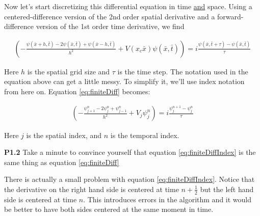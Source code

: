 
\vspace{0.25in}
Now let's start discretizing this differential equation in time
\underline{and} space.  Using a centered-difference version of the 2nd
order spatial derivative and a forward-difference version of the 1st
order time derivative, we find

\begin{align}
 \left( - \frac{\psi(\bar{x}+h,\bar{t}) - 2 \psi(\bar{x},\bar{t}) + \psi(\bar{x} - h,\bar{t})}{h^2} +
   V(x_c \bar{x}) \psi(\bar{x},\bar{t}) \right) = i \frac{\psi(\bar{x},\bar{t}+\tau) -
   \psi(\bar{x},\bar{t})}{\tau}\label{eq:finiteDiff}
\end{align}

Here $h$ is the spatial grid size and $\tau$ is the time step.  The
notation used in the equation above can get a little messy.  To
simplify it, we'll use index notation from here on.  Equation \eqref{eq:finiteDiff}
becomes:

\begin{align}
 \left( - \frac{\psi_{j+1}^n - 2 \psi_j^n + \psi_{j-1}^n}{h^2} +
   V_j \psi_j^n \right) = i \frac{\psi_j^{n+1} -
   \psi_j^n}{\tau}\label{eq:finiteDiffIndex}
\end{align}

Here $j$ is the spatial index, and $n$ is the temporal index.

\vspace{0.25in}
\begin{minipage}{0.9\linewidth}
\noindent\textbf{P1.2} Take a minute to convince yourself that
equation \eqref{eq:finiteDiffIndex} is the same thing as equation \eqref{eq:finiteDiff}
\end{minipage}
\vspace{0.25in}
 
There is actually a small problem with equation
\eqref{eq:finiteDiffIndex}.  Notice that the derivative on the right hand
side is centered at time $n + \frac{1}{2}$ but the left hand side is
centered at time $n$.  This introduces errors in the algorithm and it
would be better to have both sides centered at the same moment in
time.  

